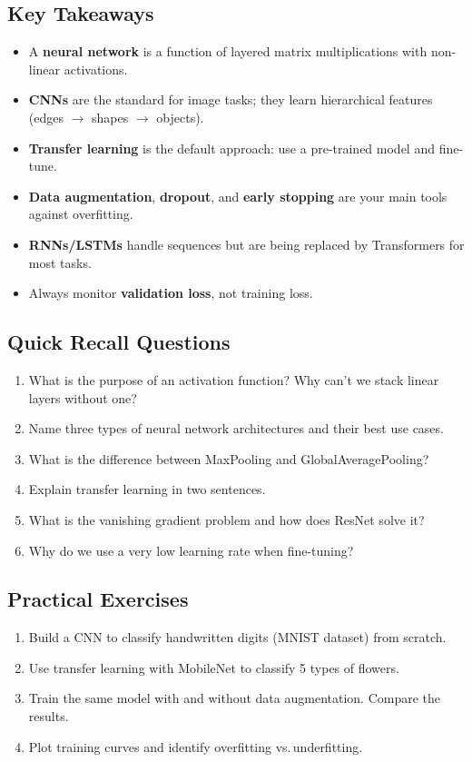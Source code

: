 \documentclass[12pt, a4paper, oneside]{book}
\begin{document}
\subsection{Key Takeaways}
\begin{itemize}[leftmargin=2em]
    \item A \textbf{neural network} is a function of layered matrix multiplications with non-linear activations.
    \item \textbf{CNNs} are the standard for image tasks; they learn hierarchical features (edges $\to$ shapes $\to$ objects).
    \item \textbf{Transfer learning} is the default approach: use a pre-trained model and fine-tune.
    \item \textbf{Data augmentation}, \textbf{dropout}, and \textbf{early stopping} are your main tools against overfitting.
    \item \textbf{RNNs/LSTMs} handle sequences but are being replaced by Transformers for most tasks.
    \item Always monitor \textbf{validation loss}, not training loss.
\end{itemize}

\subsection{Quick Recall Questions}
\begin{enumerate}[leftmargin=2em]
    \item What is the purpose of an activation function? Why can't we stack linear layers without one?
    \item Name three types of neural network architectures and their best use cases.
    \item What is the difference between MaxPooling and GlobalAveragePooling?
    \item Explain transfer learning in two sentences.
    \item What is the vanishing gradient problem and how does ResNet solve it?
    \item Why do we use a very low learning rate when fine-tuning?
\end{enumerate}

\subsection{Practical Exercises}
\begin{enumerate}[leftmargin=2em]
    \item Build a CNN to classify handwritten digits (MNIST dataset) from scratch.
    \item Use transfer learning with MobileNet to classify 5 types of flowers.
    \item Train the same model with and without data augmentation. Compare the results.
    \item Plot training curves and identify overfitting vs.\,underfitting.
\end{enumerate}
\end{document}
